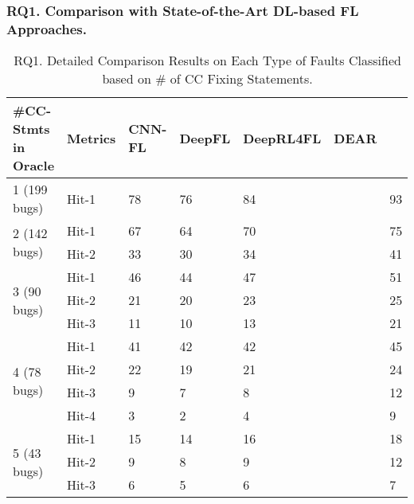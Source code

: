 \subsubsection{\bf RQ1. Comparison with State-of-the-Art DL-based FL Approaches.}
\label{sec:rq1-result}

\begin{table}[t]
	\caption{RQ1. Detailed Comparison Results on Each Type of Faults Classified based on \# of CC Fixing Statements.}
	\vspace{-10pt}
        \tabcolsep 2pt
	{\footnotesize
		\begin{center}
			\renewcommand{\arraystretch}{1}
			\begin{tabular}{p{1.3cm}<{\centering}|p{0.8cm}<{\centering}|p{1cm}<{\centering}|p{0.8cm}<{\centering}|p{1.3cm}<{\centering}|p{1cm}<{\centering}|p{1.3cm}<{\centering}}
				\hline
				\#CC-Stmts in Oracle & Metrics & CNN-FL & DeepFL & DeepRL4FL & DEAR & \tool \\
				\hline
				\multirow{1}{*}{1 (199 bugs)}   & Hit-1  & 78 & 76 & 84 & & 93 \\
				\hline
				\multirow{2}{*}{2 (142 bugs)}  & Hit-1   & 67 & 64 & 70 & & 75 \\
				& Hit-2         & 33 & 30 & 34 & & 41 \\
				\hline
				\multirow{3}{*}{3 (90 bugs)}  & Hit-1    & 46 & 44 & 47 & & 51 \\
				& Hit-2     & 21 & 20 & 23 & & 25\\
				& Hit-3     & 11 &10 & 13 & & 21 \\
				\hline
				\multirow{4}{*}{4 (78 bugs)}  & Hit-1    & 41 & 42 & 42 & & 45 \\
				& Hit-2     &22 & 19 & 21 & & 24 \\
				& Hit-3     & 9 & 7 & 8 & & 12 \\
				& Hit-4     & 3 & 2 & 4 & & 9 \\
				\hline
				\multirow{5}{*}{5 (43 bugs)}  & Hit-1    & 15 & 14 & 16 & & 18 \\
				& Hit-2     & 9 & 8 & 9 & & 12 \\
				& Hit-3     & 6 & 5 & 6 & & 7 \\

\end{tabular}
\end{center}}
\end{table}
